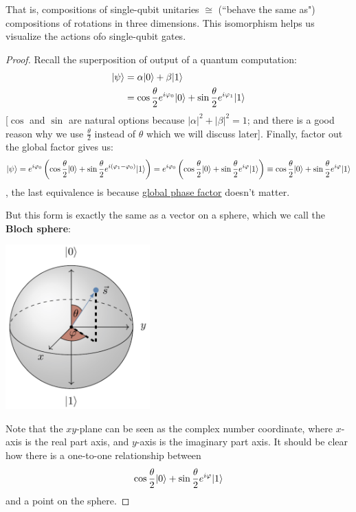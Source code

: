 \documentclass[12pt]{article}
\begin{document}
\begin{theorem}[$U(2)/U(1) \cong \SO(3)$]\label{thm:unitaries-to-rotation-iso}
That is, compositions of single-qubit unitaries $\cong$ (``behave the same as") compositions of rotations in three dimensions. This isomorphism helps us visualize the actions ofo single-qubit gates.
\end{theorem}
\begin{proof}
Recall the superposition of output of a quantum computation:$$
\begin{aligned}
\Ket{\psi}
    &= \alpha \Ket{0} + \beta \Ket{1}\\
    &= \cos\frac{\theta}{2} e^{i\varphi_0} \Ket{0} + \sin\frac{\theta}{2} e^{i\varphi_1} \Ket{1}
\end{aligned}
$$ [$\cos$ and $\sin$ are natural options because $|\alpha|^2 + |\beta|^2 = 1$; and there is a good reason why we use $\frac{\theta}{2}$ instead of $\theta$ which we will discuss later]. Finally, factor out the global factor gives us: $$
\Ket{\psi} = e^{i\varphi_0}\prt{\cos\frac{\theta}{2}  \Ket{0} + \sin\frac{\theta}{2} e^{i(\varphi_1 - \varphi_0)} \Ket{1}} = e^{i\varphi_0}\prt{\cos\frac{\theta}{2}  \Ket{0} + \sin\frac{\theta}{2} e^{i\varphi} \Ket{1}} \equiv \cos\frac{\theta}{2}  \Ket{0} + \sin\frac{\theta}{2} e^{i\varphi} \Ket{1}
$$, the last equivalence is because \underline{global phase factor} doesn't matter.

But this form is exactly the same as a vector on a sphere, which we call the \textbf{Bloch sphere}:
\begin{center}
\includegraphics[width = 15em]{images/7.jpg}
\end{center}
Note that the $xy$-plane can be seen as the complex number coordinate, where $x$-axis is the real part axis, and $y$-axis is the imaginary part axis. It should be clear how there is a one-to-one relationship between $$
\cos\frac{\theta}{2}  \Ket{0} + \sin\frac{\theta}{2} e^{i\varphi} \Ket{1}
$$ and a point on the sphere.
\end{proof}
\end{document}
